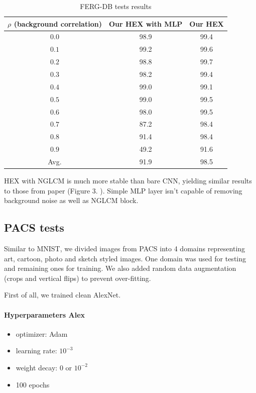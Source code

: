 \documentclass{article} %
\begin{document}
\begin{table}[H]
    \caption{FERG-DB tests results}
    \centering
    \begin{tabular}{ccc}
        \hline
        $\rho$ \scriptsize{(background correlation)} & Our HEX with MLP& Our HEX\\
        \hline
        $0.0$ & 98.9 & 99.4 \\
        $0.1$ & 99.2 & 99.6 \\
        $0.2$ & 98.8 & 99.7 \\
        $0.3$ & 98.2 & 99.4 \\
        $0.4$ & 99.0 & 99.1 \\
        $0.5$ & 99.0 & 99.5 \\
        $0.6$ & 98.0 & 99.5 \\
        $0.7$ & 87.2 & 98.4 \\
        $0.8$ & 91.4 & 98.4 \\
        $0.9$ & 49.2 & 91.6 \\
        \hline
        Avg. & 91.9 & 98.5 \\
        \hline
    \end{tabular}
\end{table}
    
HEX with NGLCM is much more stable than bare CNN, yielding similar results
to those from paper (Figure 3.  \citep{wang2018learning}). 
Simple MLP layer isn't capable of removing background noise as well as NGLCM block.

\subsection{PACS tests}
    
Similar to MNIST, we divided images from PACS into 4 domains representing art, cartoon, photo and sketch styled
images. One domain was used for testing and remaining ones for training. We also added random data augmentation (crops and vertical flips) to prevent over-fitting.

\pagebreak

First of all, we trained clean AlexNet.

\paragraph{Hyperparameters Alex} 
\begin{itemize}[noitemsep]
    \item optimizer: Adam
    \item learning rate: $10^{-3}$
    \item weight decay: $0$ or $10^{-2}$
    \item 100 epochs
\end{itemize}
\end{document}
